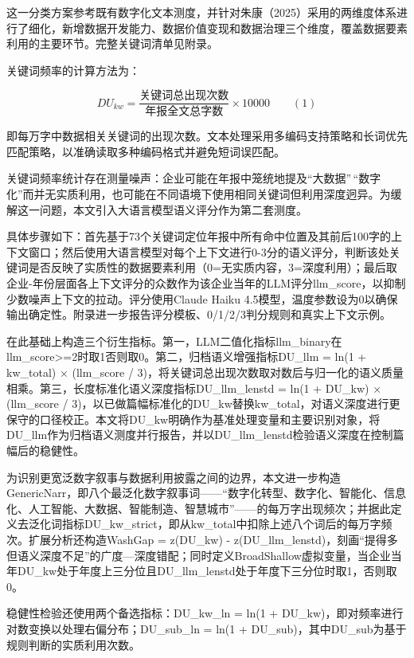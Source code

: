 这一分类方案参考既有数字化文本测度，并针对朱康（2025）采用的两维度体系进行了细化，新增数据开发能力、数据价值变现和数据治理三个维度，覆盖数据要素利用的主要环节。完整关键词清单见附录。

关键词频率的计算方法为：

\[DU_{kw} = \frac{\text{关键词总出现次数}}{\text{年报全文总字数}} \times 10000 \qquad (1)\]

即每万字中数据相关关键词的出现次数。文本处理采用多编码支持策略和长词优先匹配策略，以准确读取多种编码格式并避免短词误匹配。

关键词频率统计存在测量噪声：企业可能在年报中笼统地提及``大数据''\,``数字化''而并无实质利用，也可能在不同语境下使用相同关键词但利用深度迥异。为缓解这一问题，本文引入大语言模型语义评分作为第二套测度。

具体步骤如下：首先基于73个关键词定位年报中所有命中位置及其前后100字的上下文窗口；然后使用大语言模型对每个上下文进行0-3分的语义评分，判断该处关键词是否反映了实质性的数据要素利用（0=无实质内容，3=深度利用）；最后取企业-年份层面各上下文评分的众数作为该企业当年的LLM评分llm\_score，以抑制少数噪声上下文的拉动。评分使用Claude Haiku 4.5模型，温度参数设为0以确保输出确定性。附录进一步报告评分模板、0/1/2/3判分规则和真实上下文示例。

在此基础上构造三个衍生指标。第一，LLM二值化指标llm\_binary在llm\_score\textgreater=2时取1否则取0。第二，归档语义增强指标DU\_llm = ln(1 + kw\_total) × (llm\_score / 3)，将关键词总出现次数取对数后与归一化的语义质量相乘。第三，长度标准化语义深度指标DU\_llm\_lenstd = ln(1 + DU\_kw) × (llm\_score / 3)，以已做篇幅标准化的DU\_kw替换kw\_total，对语义深度进行更保守的口径校正。本文将DU\_kw明确作为基准处理变量和主要识别对象，将DU\_llm作为归档语义测度并行报告，并以DU\_llm\_lenstd检验语义深度在控制篇幅后的稳健性。

为识别更宽泛数字叙事与数据利用披露之间的边界，本文进一步构造GenericNarr，即八个最泛化数字叙事词------``数字化转型、数字化、智能化、信息化、人工智能、大数据、智能制造、智慧城市''------的每万字出现频次；并据此定义去泛化词指标DU\_kw\_strict，即从kw\_total中扣除上述八个词后的每万字频次。扩展分析还构造WashGap = z(DU\_kw) - z(DU\_llm\_lenstd)，刻画``提得多但语义深度不足''的广度---深度错配；同时定义BroadShallow虚拟变量，当企业当年DU\_kw处于年度上三分位且DU\_llm\_lenstd处于年度下三分位时取1，否则取0。

稳健性检验还使用两个备选指标：DU\_kw\_ln = ln(1 + DU\_kw)，即对频率进行对数变换以处理右偏分布；DU\_sub\_ln = ln(1 + DU\_sub)，其中DU\_sub为基于规则判断的实质利用次数。

